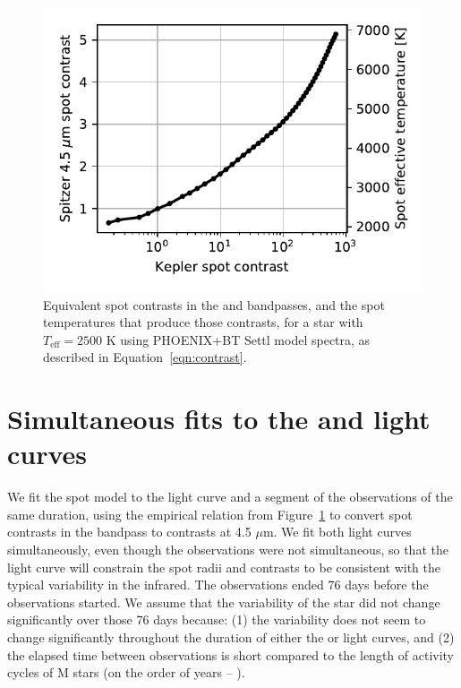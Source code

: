 \begin{figure}
\begin{center}
\includegraphics[scale=0.85]{trappist1_bright/kepler_spitzer_contrasts.pdf}
\end{center}
\caption{Equivalent spot contrasts in the \spitzer and \kepler bandpasses, and the spot temperatures that produce those contrasts, for a star with $T_\mathrm{eff} = 2500$ K using PHOENIX+BT Settl model spectra, as described in Equation~\ref{eqn:contrast}. \label{fig:contrast}}
\end{figure}

\section{Simultaneous fits to the \kepler and \spitzer light curves} \label{lightcurve_fits}

We fit the spot model to the \kepler light curve and a segment of the \spitzer observations of the same duration, using the empirical relation from Figure~\ref{fig:contrast} to convert spot contrasts in the \kepler bandpass to contrasts at 4.5 $\mu$m. We fit both light curves simultaneously, even though the observations were not simultaneous, so that the \spitzer light curve will constrain the spot radii and contrasts to be consistent with the typical variability in the infrared. The \kepler observations ended 76 days before the \spitzer observations started. We assume that the variability of the star did not change significantly over those 76 days because: (1) the variability does not seem to change significantly throughout the duration of either the \kepler or \spitzer light curves, and (2) the elapsed time between observations is short compared to the length of activity cycles of M stars (on the order of years -- \citealt[see e.g.~][]{Mascareno2016}).


